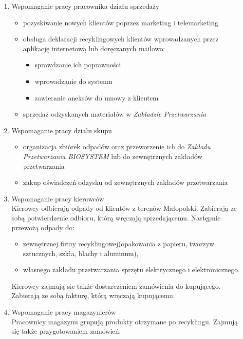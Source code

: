 

\begin{enumerate}
	\item Wspomaganie pracy pracownika działu sprzedaży \\
		\begin{itemize}
			\item pozyskiwanie nowych klientów poprzez marketing i telemarketing
			\item obsługa deklaracji recyklingowych klientów wprowadzanych przez aplikację internetową lub doręczanych mailowo: 
				\begin{itemize}
					\item sprawdzanie ich poprawności
					\item wprowadzanie do systemu
					\item zawieranie aneksów do umowy z klientem
				\end{itemize}
			\item sprzedaż odzyskanych materiałów w \emph{Zakładzie Przetwarzania}
		\end{itemize}

	\item Wspomaganie pracy działu skupu \\
		\begin{itemize}
			\item organizacja zbiórek odpadów oraz przeworzenie ich do \emph{Zakładu Przetwarzania BIOSYSTEM} lub do zewnętrznych zakładów przetwarzania
			\item zakup oświadczeń odzysku od zewnętrznych zakładów przetwarzania
		\end{itemize}

	\item Wspomaganie pracy kierowców \\
	Kierowcy odbierają odpady od klientów z terenów Małopolski. Zabierają ze sobą potwierdzenie odbioru, którą wręczają sprzedającemu. Następnie przewożą odpady do:
		\begin{itemize}
			\item zewnętrznej firmy recyklingowej(opakowania z papieru, tworzyw sztucznych, szkła, blachy i aluminum),
			\item własnego zakładu przetwarzania sprzętu elektrycznego i elektronicznego.
		\end{itemize}
	Kierowcy zajmują sie także dostarczeniem zamówienia do kupującego. Zabierają ze sobą fakturę, którą wręczają kupującemu.

	\item Wspomaganie pracy magazynierów \\
	Pracownicy magazynu grupują produkty otrzymane po recyklingu. Zajmują się także przygotowaniem zamówień.
\end{enumerate}
